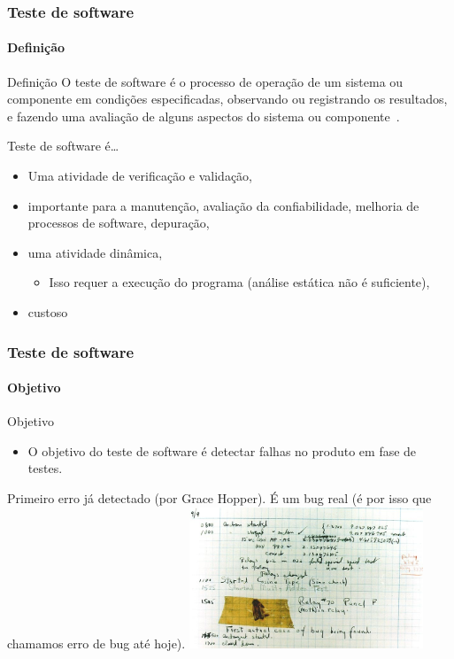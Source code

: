 \begin{frame}[hasprev=true, hasnext=true]
\frametitle{Teste de software}
\framesubtitle{Definição}
\label{concept:software-testing}

\begin{block:concept}{Definição}
O teste de software é o processo de operação de um sistema ou componente em condições especificadas, observando ou registrando os resultados, e fazendo uma avaliação de alguns aspectos do sistema ou componente~\cite{ieee610.12:1990}.
\end{block:concept}

\begin{block:fact}{Teste de software é\dots{}}
\begin{itemize}
	\item Uma atividade de verificação e validação,

	\item importante para a manutenção, avaliação da confiabilidade, melhoria de processos de software, depuração,

	\item uma atividade dinâmica,
	\begin{itemize}
		\item Isso requer a execução do programa (análise estática não é suficiente),
	\end{itemize}

	\item custoso~\cite{harrold:2000}
\end{itemize}
\end{block:fact}
\end{frame}



\begin{frame}
\frametitle{Teste de software}
\framesubtitle{Objetivo}

\begin{block:fact}{Objetivo}
\begin{itemize}
	\item O objetivo do teste de software é detectar falhas no produto em fase de testes.
\end{itemize}
\end{block:fact}

\begin{block:fact}{}
Primeiro erro já detectado (por Grace Hopper). É um bug real (é por isso que chamamos erro de bug até hoje).
\centering
\includegraphics[width=7cm]{teste-de-software/conceitos-basicos/Imagens/first-bug}
\end{block:fact}
\end{frame}


